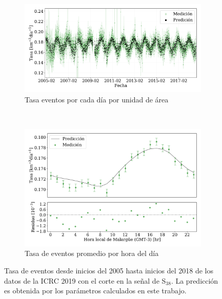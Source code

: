    \begin{figure}[H]
    \centering
       \begin{subfigure}[b]{0.85\textwidth}
       \includegraphics[width=\textwidth]{Graphs/rate_dayly/0EeV_ICRC_2019_S38_05_18.pdf}
       \caption{Tasa eventos por cada día por unidad de área}
       \label{fig:rate_day_ICRC_19_S38_05_18}
       \end{subfigure}\\%
       \begin{subfigure}[b]{0.85\textwidth}
       \includegraphics[width=\textwidth]{Graphs/rate_hour_of_the_day/S38_above_0EeV_hour_of_the_day.pdf}
       \caption{Tasa de eventos promedio por hora del día}
       \label{fig:rate_2015_ICRC_19_S38_05_18}
       \end{subfigure}%
       \caption{Tasa de eventos desde inicios del 2005 hasta inicios del 2018 de los datos de la ICRC 2019 con el corte en la señal de S$_{38}$. La predicción es obtenida por los parámetros calculados en este trabajo.}\label{fig:rate_new_18_S38}
   \end{figure}

